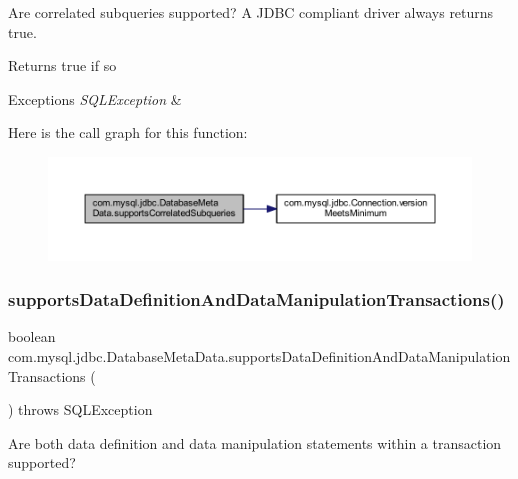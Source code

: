 Are correlated subqueries supported? A J\+D\+BC compliant driver always returns true.

\begin{DoxyReturn}{Returns}
true if so 
\end{DoxyReturn}

\begin{DoxyExceptions}{Exceptions}
{\em S\+Q\+L\+Exception} & \\
\hline
\end{DoxyExceptions}
Here is the call graph for this function\+:
\nopagebreak
\begin{figure}[H]
\begin{center}
\leavevmode
\includegraphics[width=350pt]{classcom_1_1mysql_1_1jdbc_1_1_database_meta_data_ac2e45eb8d0befb92a37a71a20d9cde24_cgraph}
\end{center}
\end{figure}
\mbox{\label{classcom_1_1mysql_1_1jdbc_1_1_database_meta_data_a661e1614b3b0914c06d415bf42e2791a}} 
\subsubsection{\texorpdfstring{supports\+Data\+Definition\+And\+Data\+Manipulation\+Transactions()}{supportsDataDefinitionAndDataManipulationTransactions()}}
{\footnotesize\ttfamily boolean com.\+mysql.\+jdbc.\+Database\+Meta\+Data.\+supports\+Data\+Definition\+And\+Data\+Manipulation\+Transactions (\begin{DoxyParamCaption}{ }\end{DoxyParamCaption}) throws S\+Q\+L\+Exception}

Are both data definition and data manipulation statements within a transaction supported?

